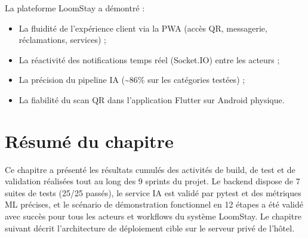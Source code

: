 La plateforme LoomStay a démontré :
\begin{itemize}
  \item La fluidité de l'expérience client via la PWA (accès QR, messagerie, réclamations, services) ;
  \item La réactivité des notifications temps réel (Socket.IO) entre les acteurs ;
  \item La précision du pipeline IA (\textasciitilde{}86\% sur les catégories testées) ;
  \item La fiabilité du scan QR dans l'application Flutter sur Android physique.
\end{itemize}

\section*{Résumé du chapitre}

Ce chapitre a présenté les résultats cumulés des activités de build, de test et de validation réalisées tout au long des 9 sprints du projet. Le backend dispose de 7 suites de tests (25/25 passés), le service IA est validé par pytest et des métriques ML précises, et le scénario de démonstration fonctionnel en 12 étapes a été validé avec succès pour tous les acteurs et workflows du système LoomStay. Le chapitre suivant décrit l'architecture de déploiement cible sur le serveur privé de l'hôtel.
